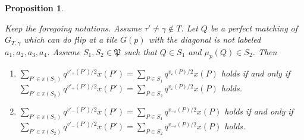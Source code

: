 \documentclass[10pt]{amsart}
\theoremstyle{theorems}
\newtheorem{Proposition}[Theorem]{Proposition}
\begin{document}
\begin{Proposition}\label{non-a}

Keep the foregoing notations. Assume $\tau'\neq \gamma\notin T$. Let $Q$ be a perfect matching of $G_{T,\gamma}$ which can do flip at a tile $G(p)$ with the diagonal is not labeled $a_1,a_2,a_3,a_4$. Assume $S_1,S_2\in \mathfrak P$ such that $Q\in S_1$ and $\mu_{p}(Q)\in S_2$. Then

\begin{enumerate}[$(1)$]

  \item $\sum_{P'\in \pi(S_1)}q^{v'_{+}(P')/2}x(P')=\sum_{P\in S_1}q^{v_{\varepsilon}(P)/2}x(P)$ holds if and only if\\
   $\sum_{P'\in \pi(S_2)}q^{v'_{+}(P')/2}x(P')=\sum_{P\in S_2}q^{v_{\varepsilon}(P)/2}x(P)$ holds.

  \item $\sum_{P'\in \pi(S_1)}q^{v'_{-}(P')/2}x(P')=\sum_{P\in S_1}q^{v_{-\varepsilon}(P)/2}x(P)$ holds if and only if\\
   $\sum_{P'\in \pi(S_2)}q^{v'_{-}(P')/2}x(P')=\sum_{P\in S_2}q^{v_{-\varepsilon}(P)/2}x(P)$ holds.

\end{enumerate}

\end{Proposition}
\end{document}

